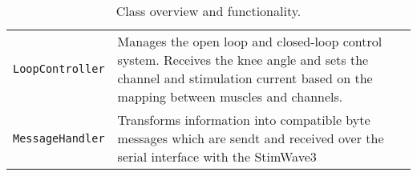 \begin{table}[H]
\begin{tcolorbox}
\begin{tabular}{p{} | p{}}
\texttt{LoopController} & Manages the open loop and closed-loop control system. Receives the knee angle and sets the channel and stimulation current based on the mapping between muscles and channels. \\

\texttt{MessageHandler} & Transforms information into compatible byte messages which are sendt and received over the serial interface with the StimWave3 \\
\end{tabular}
\end{tcolorbox}
\caption{Class overview and functionality.}
\label{tab:class-overview}
\end{table}

